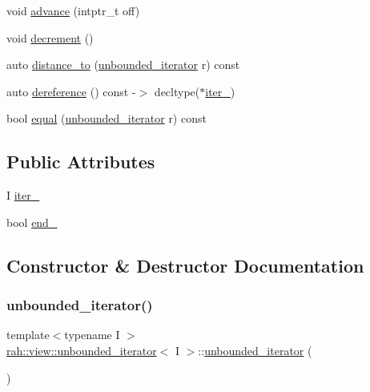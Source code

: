 \begin{DoxyCompactItemize}
void \mbox{\hyperlink{structrah_1_1view_1_1unbounded__iterator_ac5605e2d9558a9569c0e24dcf7a78c10}{advance}} (intptr\+\_\+t off)
\item 
void \mbox{\hyperlink{structrah_1_1view_1_1unbounded__iterator_ab3f812c596c17777717ff92aad65e295}{decrement}} ()
\item 
auto \mbox{\hyperlink{structrah_1_1view_1_1unbounded__iterator_a3f5ca68b137f2fb1175a100a0839a71a}{distance\+\_\+to}} (\mbox{\hyperlink{structrah_1_1view_1_1unbounded__iterator}{unbounded\+\_\+iterator}} r) const
\item 
auto \mbox{\hyperlink{structrah_1_1view_1_1unbounded__iterator_a99189d6052f625642f8e00ff6e58a860}{dereference}} () const -\/$>$ decltype($\ast$\mbox{\hyperlink{structrah_1_1view_1_1unbounded__iterator_a50affaae71d4122b92014b11763f6672}{iter\+\_\+}})
\item 
bool \mbox{\hyperlink{structrah_1_1view_1_1unbounded__iterator_ae9234860041ae72e3b2667d8121fa224}{equal}} (\mbox{\hyperlink{structrah_1_1view_1_1unbounded__iterator}{unbounded\+\_\+iterator}} r) const
\end{DoxyCompactItemize}
\subsection*{Public Attributes}
\begin{DoxyCompactItemize}
\item 
I \mbox{\hyperlink{structrah_1_1view_1_1unbounded__iterator_a50affaae71d4122b92014b11763f6672}{iter\+\_\+}}
\item 
bool \mbox{\hyperlink{structrah_1_1view_1_1unbounded__iterator_a5af8d60be5952969ccbad7ef9ce670e4}{end\+\_\+}}
\end{DoxyCompactItemize}


\subsection{Constructor \& Destructor Documentation}
\mbox{\label{structrah_1_1view_1_1unbounded__iterator_aecc43db612ed5ad8e6002356feb92b48}} 
\subsubsection{\texorpdfstring{unbounded\_iterator()}{unbounded\_iterator()}\hspace{0.1cm}{\footnotesize\ttfamily [1/4]}}
{\footnotesize\ttfamily template$<$typename I $>$ \\
\mbox{\hyperlink{structrah_1_1view_1_1unbounded__iterator}{rah\+::view\+::unbounded\+\_\+iterator}}$<$ I $>$\+::\mbox{\hyperlink{structrah_1_1view_1_1unbounded__iterator}{unbounded\+\_\+iterator}} (\begin{DoxyParamCaption}{ }\end{DoxyParamCaption})\hspace{0.3cm}{\ttfamily [default]}}

